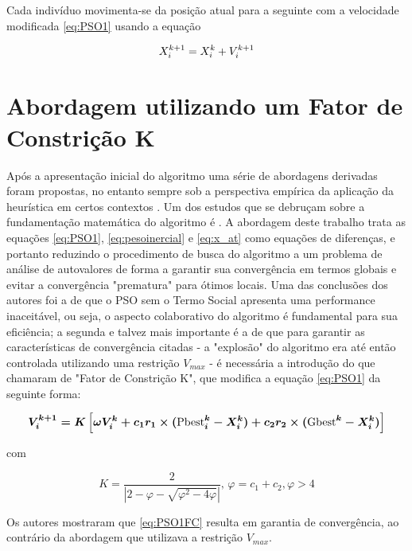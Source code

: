 \documentclass[
	12pt,				%
	openright,			%
	twoside,			%
	a4paper,			%
	english,			%
	french,				%
	spanish,			%
	brazil				%
	]{abntex2}
\begin{document}
Cada indivíduo movimenta-se da posição atual para a seguinte com a velocidade modificada \ref{eq:PSO1} usando a equação

\begin{equation}
\boldmath{X}_i^{k+1} = \boldmath{X}_i^{k} + \boldmath{V}_i^{k+1}
\label{eq:x_at}
\end{equation}




\section{Abordagem utilizando um Fator de Constrição K}

Após a apresentação inicial do algoritmo uma série de abordagens derivadas foram propostas, no entanto sempre sob a perspectiva empírica da aplicação da heurística em certos contextos \cite{van2001analysis}. Um dos estudos que se debruçam sobre a fundamentação matemática do algoritmo é \cite{clerc2002particle}. A abordagem deste trabalho trata as equações \ref{eq:PSO1}, \ref{eq:pesoinercial} e \ref{eq:x_at} como equações de diferenças, e portanto reduzindo o procedimento de busca do algoritmo a um problema de análise de autovalores de forma a garantir sua convergência em termos globais e evitar a convergência "prematura" para ótimos locais. Uma das conclusões dos autores foi a de que o PSO sem o Termo Social apresenta uma performance inaceitável, ou seja, o aspecto colaborativo do algoritmo é fundamental para sua eficiência; a segunda e talvez mais importante é a de que para garantir as características de convergência citadas - a "explosão" do algoritmo era até então controlada utilizando uma restrição $V_{max}$ - é necessária a introdução do que chamaram de "Fator de Constrição K", que modifica a equação \ref{eq:PSO1} da seguinte forma:

\begin{equation}
\boldmath{V}_i^{k+1} = K\left[\omega\boldmath{V}_i^k + c_1r_1 \times (\text{Pbest}_i^k - \boldmath{X}_i^k) + c_2r_2\times(\text{Gbest}^k - \boldmath{X}_i^k)\right]
\label{eq:PSO1FC}
\end{equation}

com

\begin{equation*}
 K = \frac{2}{|2 - \varphi - \sqrt{\varphi^2 - 4\varphi}|}\text{,	}  \varphi = c_1 + c_2, \varphi > 4
\end{equation*}

Os autores mostraram que \ref{eq:PSO1FC} resulta em garantia de convergência, ao contrário da abordagem que utilizava a restrição $V_{max}$. 
\end{document}
